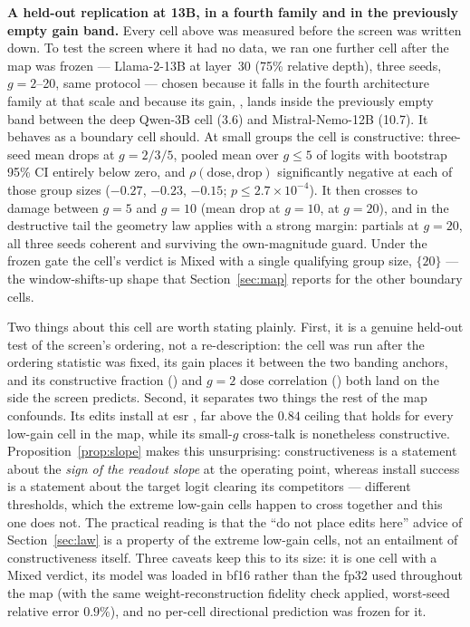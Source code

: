 \documentclass[preprint,12pt]{elsarticle}
\theoremstyle{definition}
\begin{document}
\textbf{A held-out replication at 13B, in a fourth family and in the previously empty
gain band.} Every cell above was measured before the screen was written down. To test the
screen where it had no data, we ran one further cell after the map was frozen ---
Llama-2-13B at layer~30 (75\% relative depth), three seeds, $g{=}2$--20, same protocol
--- chosen because it falls in the fourth architecture family at that scale and because
its gain, \gainThirteenB{}, lands inside the previously empty band between the deep
Qwen-3B cell (3.6) and Mistral-Nemo-12B (10.7). It behaves as a boundary cell should. At
small groups the cell is constructive: three-seed mean drops
\thirteenBDropsSmallG{} at $g{=}2/3/5$, pooled mean over $g\leq5$ of
\thirteenBConstrMean{} logits with bootstrap 95\% CI \thirteenBConstrCI{} entirely below
zero, and $\rho(\mathrm{dose},\mathrm{drop})$ significantly negative at each of those
group sizes ($-0.27$, $-0.23$, $-0.15$; $p\leq2.7\times10^{-4}$). It then crosses to
damage between $g{=}5$ and $g{=}10$ (mean drop \thirteenBDropGten{} at $g{=}10$,
\thirteenBDropGtwenty{} at $g{=}20$), and in the destructive tail the geometry law
applies with a strong margin: partials \thirteenBPartialsGtwenty{} at $g{=}20$, all three
seeds coherent and surviving the own-magnitude guard. Under the frozen gate the cell's
verdict is Mixed with a single qualifying group size, $\{20\}$ --- the
window-shifts-up shape that Section~\ref{sec:map} reports for the other boundary cells.

Two things about this cell are worth stating plainly. First, it is a genuine held-out
test of the screen's ordering, not a re-description: the cell was run after the ordering
statistic was fixed, its gain places it between the two banding anchors, and its
constructive fraction (\fracThirteenB{}) and $g{=}2$ dose correlation
(\rhoGtwoThirteenB{}) both land on the side the screen predicts. Second, it separates two
things the rest of the map confounds. Its edits install at esr \esrThirteenB{}, far above
the $0.84$ ceiling that holds for every low-gain cell in the map, while its small-$g$
cross-talk is nonetheless constructive. Proposition~\ref{prop:slope} makes this
unsurprising: constructiveness is a statement about the \emph{sign of the readout slope}
at the operating point, whereas install success is a statement about the target logit
clearing its competitors --- different thresholds, which the extreme low-gain cells happen
to cross together and this one does not. The practical reading is that the ``do not place
edits here'' advice of Section~\ref{sec:law} is a property of the extreme low-gain cells,
not an entailment of constructiveness itself. Three caveats keep this to its size: it is
one cell with a Mixed verdict, its model was loaded in bf16 rather than the fp32 used
throughout the map (with the same weight-reconstruction fidelity check applied,
worst-seed relative error $0.9\%$), and no per-cell directional prediction was frozen
for it.
\end{document}
